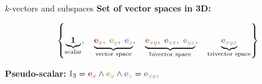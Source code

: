 

\begin{frame}{$k$-vectors and subspaces}
    \textbf{Set of vector spaces in 3D:}

    \vspace{1em}

    \[
        \left\{
        \underbrace{\mathbf{1}}_{\text{scalar}},\quad
        \underbrace{
            \textcolor{red}{\mathbf{e}_x},\
            \textcolor{green}{\mathbf{e}_y},\
            \textcolor{blue}{\mathbf{e}_z}
        }_{\text{vector space}},\quad
        \underbrace{
            \textcolor{midredgreen}{\mathbf{e}_{xy}},\
            \textcolor{midredblue}{\mathbf{e}_{zx}},\
            \textcolor{midgreenblue}{\mathbf{e}_{yz}}
        }_{\text{bivector space}},\quad
        \underbrace{
            \textcolor{mixAll}{\mathbf{e}_{xyz}}
        }_{\text{trivector space}}
        \right\}
    \]

    \vspace{1em}

    \textbf{Pseudo-scalar: }
    \(
    \textcolor{mixAll}{\mathbf{I}}_3 =
    \textcolor{red}{\mathbf{e}_x} \wedge
    \textcolor{green}{\mathbf{e}_y} \wedge
    \textcolor{blue}{\mathbf{e}_z} =
    \textcolor{mixAll}{\mathbf{e}_{xyz}}
    \)
\end{frame}







